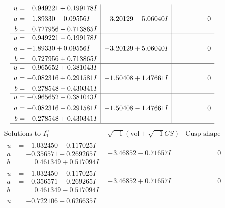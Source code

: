 \documentclass[1p]{elsarticle_modified}
\theoremstyle{definition}
\newcommand{\I}{\sqrt{-1}}
\begin{document}
$$\begin{array}{c|c|c}
\begin{aligned}
u &= \phantom{-}0.949221 + 0.199178 I \\
a &= -1.89330 - 0.09556 I \\
b &= \phantom{-}0.727956 - 0.713865 I\end{aligned}
 & -3.20129 - 5.06040 I & \phantom{-0.000000 } 0 \\ \hline\begin{aligned}
u &= \phantom{-}0.949221 - 0.199178 I \\
a &= -1.89330 + 0.09556 I \\
b &= \phantom{-}0.727956 + 0.713865 I\end{aligned}
 & -3.20129 + 5.06040 I & \phantom{-0.000000 } 0 \\ \hline\begin{aligned}
u &= -0.965652 + 0.381043 I \\
a &= -0.082316 + 0.291581 I \\
b &= \phantom{-}0.278548 - 0.430341 I\end{aligned}
 & -1.50408 + 1.47661 I & \phantom{-0.000000 } 0 \\ \hline\begin{aligned}
u &= -0.965652 - 0.381043 I \\
a &= -0.082316 - 0.291581 I \\
b &= \phantom{-}0.278548 + 0.430341 I\end{aligned}
 & -1.50408 - 1.47661 I & \phantom{-0.000000 } 0\\
 \hline 
 \end{array}$$\newpage$$\begin{array}{c|c|c}  
\text{Solutions to }I^u_{1}& \I (\text{vol} + \sqrt{-1}CS) & \text{Cusp shape}\\
 \hline 
\begin{aligned}
u &= -1.032450 + 0.117025 I \\
a &= -0.356571 - 0.269265 I \\
b &= \phantom{-}0.461349 + 0.517094 I\end{aligned}
 & -3.46852 - 0.71657 I & \phantom{-0.000000 } 0 \\ \hline\begin{aligned}
u &= -1.032450 - 0.117025 I \\
a &= -0.356571 + 0.269265 I \\
b &= \phantom{-}0.461349 - 0.517094 I\end{aligned}
 & -3.46852 + 0.71657 I & \phantom{-0.000000 } 0 \\ \hline\begin{aligned}
u &= -0.722106 + 0.626635 I \\

\end{aligned}
\end{array}$$
\end{document}
